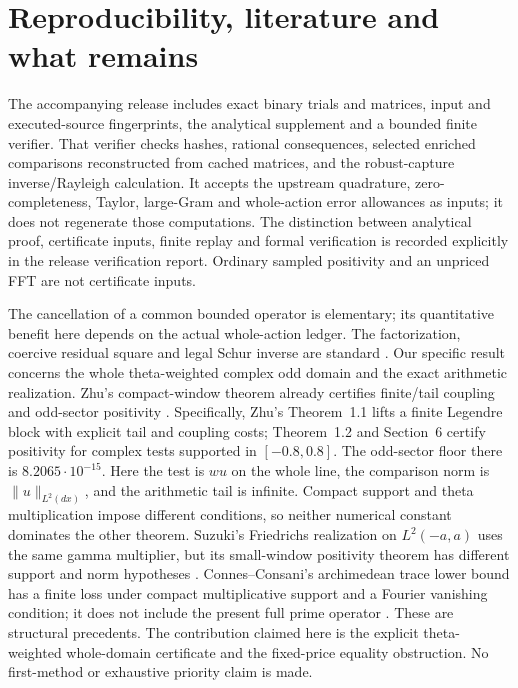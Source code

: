 \documentclass[12pt]{article}
\theoremstyle{remark}\newtheorem{remark}[theorem]{Remark}
\begin{document}
\section{Reproducibility, literature and what remains}
The accompanying release includes exact binary trials and matrices,
input and executed-source fingerprints, the analytical supplement and a
bounded finite verifier. That verifier checks hashes, rational consequences,
selected enriched comparisons reconstructed from cached matrices, and the
robust-capture inverse/Rayleigh calculation. It accepts the upstream
quadrature, zero-completeness, Taylor, large-Gram and whole-action error
allowances as inputs; it does not regenerate those computations.
The distinction between analytical proof, certificate inputs, finite replay
and formal verification is recorded explicitly in the release verification report.
Ordinary sampled positivity and an unpriced FFT are not certificate inputs.

The cancellation of a common bounded operator is elementary; its
quantitative benefit here depends on the actual whole-action ledger.
The factorization, coercive residual square and legal Schur inverse are
standard \cite{Douglas,PR,DSS}. Our specific result concerns the whole
theta-weighted complex odd domain and the exact arithmetic realization.
Zhu's compact-window theorem already certifies finite/tail coupling and
odd-sector positivity \cite[Theorems 1.1--1.2 and Section 6]{Zhu}.
Specifically, Zhu's Theorem~1.1 lifts a finite Legendre block with
explicit tail and coupling costs; Theorem~1.2 and Section~6 certify
positivity for complex tests supported in $[-0.8,0.8]$. The odd-sector
floor there is $8.2065\cdot10^{-15}$. Here the test is $wu$ on the whole
line, the comparison norm is $\|u\|_{L^2(dx)}$, and the arithmetic tail
is infinite. Compact support and theta multiplication impose different
conditions, so neither numerical constant dominates the other theorem.
Suzuki's Friedrichs realization on $L^2(-a,a)$ uses the same gamma
multiplier, but its small-window positivity theorem has different
support and norm hypotheses \cite[Theorems 1.1 and 1.4]{Suzuki}.
Connes--Consani's archimedean trace lower bound has a finite loss under
compact multiplicative support and a Fourier vanishing condition; it
does not include the present full prime operator
\cite[Theorem 6.11]{CC}. These are structural precedents. The contribution
claimed here is the explicit theta-weighted whole-domain certificate
and the fixed-price equality obstruction. No first-method or exhaustive
priority claim is made.
\end{document}
